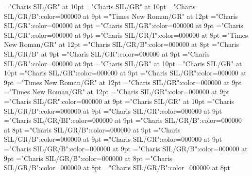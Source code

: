 \documentclass[gps1,twoside]{article}
\begin{document}
\pagestyle{plain}
\sloppy
\setlength{\parfillskip}{0pt plus 1fil}
\font\xitemte="Charis SIL/GR" at 10pt
\font\xitemhi="Charis SIL/GR" at 10pt
\font\xitemxitemcomplexformformbefore="Charis SIL/GR/B":color=000000 at 9pt
\font\xitemxitemcomplexformrefsbefore="Times New Roman/GR" at 12pt
\font\xitemxitemdefinitionbefore="Charis SIL/GR":color=000000 at 9pt
\font\xitemxitementryrefcomponentbefore="Charis SIL/GR":color=000000 at 9pt
\font\xitemxitementryreftypebefore="Charis SIL/GR":color=000000 at 9pt
\font\xitemxitemexamplebefore="Charis SIL/GR/I":color=000000 at 8pt
\font\xitemxitemexamplesbefore="Times New Roman/GR" at 12pt
\font\xitemxitemheadwordbefore="Charis SIL/GR/B":color=000000 at 8pt
\font\xitemxitemLexEntrypublishStemComponentTargetHeadWordRefbefore="Charis SIL/GR/B" at 9pt
\font\xitemxitemLexEntryTypepublishStemComplexFormTypeReverseAbbrPubbefore="Charis SIL/GR":color=000000 at 9pt
\font\xitemxitemLexEntryTypepublishStemEntryTypeAbbreviationPubbefore="Charis SIL/GR":color=000000 at 9pt
\font\xitemxitemLexSensepublishStemGlossPubLdbefore="Charis SIL/GR" at 10pt
\font\xitemxitemLexSensepublishStemGlossPubLebefore="Charis SIL/GR" at 10pt
\font\xitemxitempartofspeechbefore="Charis SIL/GR":color=000000 at 9pt
\font\xitemxitempictureLabelbefore="Charis SIL/GR":color=000000 at 9pt
\font\xitemxitemprimaryrefsbefore="Times New Roman/GR" at 12pt
\font\xitemxitempronunciationbefore="Charis SIL/GR":color=000000 at 9pt
\font\xitemxitempronunciationsbefore="Times New Roman/GR" at 12pt
\font\sensesensesensesbefore="Charis SIL/GR":color=000000 at 9pt
\font\xitemxitemtranslationbefore="Charis SIL/GR":color=000000 at 9pt
\font\xitemxitemtranslationLdbefore="Charis SIL/GR" at 10pt
\font\xitemxitemcrossrefbefore="Charis SIL/GR/B":color=000000 at 9pt
\font\xitemxitemcrossreftargetsbefore="Charis SIL/GR":color=000000 at 9pt
\font\xitemxitemcrossreftypebefore="Charis SIL/GR/BI":color=000000 at 9pt
\font\xitemxitemheadwordminorbefore="Charis SIL/GR/B":color=000000 at 8pt
\font\xitemxitemmainentryrefbefore="Charis SIL/GR/B":color=000000 at 9pt
\font\xitemxitemmainentryrefminorbefore="Charis SIL/GR/B":color=000000 at 9pt
\font\xitemxitempronunciationminorbefore="Charis SIL/GR":color=000000 at 9pt
\font\xitemxitemsensecrossrefbefore="Charis SIL/GR/B":color=000000 at 9pt
\font\xitemxitemsensemainentryrefbefore="Charis SIL/GR/B":color=000000 at 9pt
\font\xitemxitemheadwordsubbefore="Charis SIL/GR/B":color=000000 at 8pt
\font\xitemxitemLexEntrypublishRootMinorPrimaryTargetMLHeadWordPubbefore="Charis SIL/GR/B":color=000000 at 8pt
\font\xitemxitemLexEntrypublishStemMinorPrimaryTargetMLHeadWordPubbefore="Charis SIL/GR/B":color=000000 at 8pt
\end{document}
